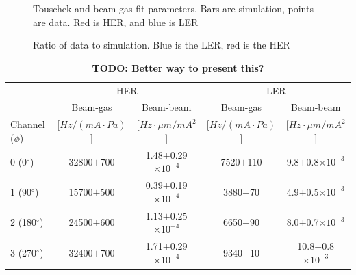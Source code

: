 \begin{figure}
	\centering
	\caption[Touschek and beam-gas fit parameters]{Touschek and beam-gas fit parameters. Bars are simulation, points are data. Red is HER, and blue is LER}
\label{fig:LERSimCompare}
\end{figure}






\begin{figure}
	\centering
	\caption[Ratio of data to simulation]{Ratio of data to simulation. Blue is the LER, red is the HER}
\label{fig:DataSimRatio}
\end{figure}





\begin{table}
	\centering
	\begin{tabular}{ lcccc }
			&	\multicolumn{2}{c}{HER}			& \multicolumn{2}{c}{LER}			\\
  			&  Beam-gas  		& Beam-beam		&  Beam-gas 		& Beam-beam  		\\ 
	Channel ($\phi$)&  [$Hz/(mA\cdot Pa)$]	& [$Hz\cdot\mu m/mA^{2}$]	& [$Hz/(mA\cdot Pa)$]	& [$Hz\cdot\mu m/mA^{2}$]\\ \hline \hline
	0 (0$^{\circ}$) & 32800$\pm$700	& 1.48$\pm$0.29$\times10^{-4}$	& 7520$\pm$110		& 9.8$\pm$0.8$\times10^{-3}$			\\	
	1 (90$^{\circ}$)& 15700$\pm$500	& 0.39$\pm$0.19$\times10^{-4}$	& 3880$\pm$70		& 4.9$\pm$0.5$\times10^{-3}$			\\
	2 (180$^{\circ}$)& 24500$\pm$600& 1.13$\pm$0.25$\times10^{-4}$	& 6650$\pm$90		& 8.0$\pm$0.7$\times10^{-3}$			\\
	3 (270$^{\circ}$)& 32400$\pm$700& 1.71$\pm$0.29$\times10^{-4}$	& 9340$\pm$10		& 10.8$\pm$0.8$\times10^{-3}$			\\ \hline

	\end{tabular}
	\caption[Beam-beam fits]{\textbf{TODO: Better way to present this?}}
	\label{tab:beam beam fits}
\end{table}









